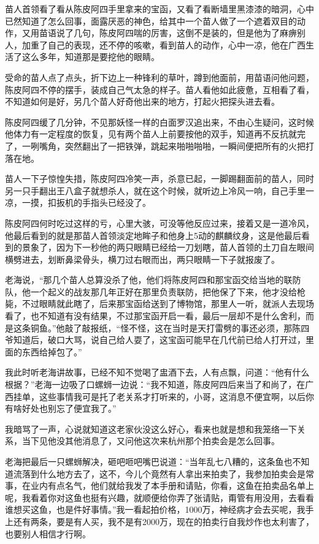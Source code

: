 苗人首领看了看从陈皮阿四手里拿来的宝函，又看了看断墙里黑漆漆的暗洞，心中已然知道了怎么回事，面露厌恶的神色，给其中一个苗人做了一个遮着双目的动作，又用苗语说了几句，陈皮阿四喘的厉害，这倒不是装的，但是他为了麻痹别人，加重了自己的表现，还不停的咳嗽，看到苗人的动作，心中一凉，他在广西生活了这么多年，知道那是要挖他的眼睛。

受命的苗人点了点头，折下边上一种锋利的草叶，蹲到他面前，用苗语问他问题，陈皮阿四不停的摆手，装成自己气太急的样子。苗人看他如此疲惫，互相看了看，不知道如何是好，另几个苗人好奇他出来的地方，打起火把探头进去看。

陈皮阿四缓了几分钟，不见那妖怪一样的白面罗汉追出来，不由心生疑问，这时候他体力有一定程度的恢复，见有两个苗人上前要按他的双手，知道再不反抗就完了，一咧嘴角，突然翻出了一把铁弹，跳起来啪啪啪啪，一瞬间便把所有的火把打落在地。

苗人一下子惊惶失措，陈皮阿四冷笑一声，杀意已起，一脚踢翻面前的苗人，同时另一只手翻出王八盒子就想杀人，就在这个时候，就听边上冷风一响，自己手里一凉，一摸，扣扳机的手指头已经没了。

陈皮阿四何时吃过这样的亏，心里大骇，可没等他反应过来，接着又是一道冷风，他最后看到的就是那苗人首领淡定地眸子和他身上5动的麒麟纹身，这是他最后看到的景象了，因为下一秒他的两只眼睛已经给一刀划瞎，苗人首领的土刀自左眼间横劈进去，划断鼻梁骨头，横刀过右眼而出，两只眼睛一下子就报废了。

老海说，“那几个苗人总算没杀了他，他们将陈皮阿四和那宝函交给当地的联防队，他一个起义的战友那几年正好在那里负责联防，把他保了下来，他才没给枪毙，不过眼睛就此瞎了，后来那宝函给送到了博物馆，那里人一听，就派人去现场看了，也不知道有没有结果，不过那宝函开启一看，最后一层却不是什么舍利，而是这条铜鱼。”他敲了敲报纸，“怪不怪，这在当时是天打雷劈的事还必须，那陈四爷知道后，破口大骂，说自己给人耍了，这宝函可能早在几代前已给人打开过，里面的东西给掉包了。”

我此时听老海讲故事，已经不知不觉喝了盅酒下去，人有点飘，问道：“他有什么根据？”老海一边吸了口螺蛳一边说：“我不知道，陈皮阿四后来当了和尚了，在广西挂单，这些事情我可是托了老关系才打听来的，小哥，这消息不便宜啊，以后你有啥好处也别忘了便宜我了。”

我暗骂了一声，心说就知道这老家伙没这么好心，看来也就是想和我笼络一下关系，当下见他没其他消息了，又问他这次来杭州那个拍卖会是怎么回事。

老海把最后一只螺蛳解决，砸吧咂吧嘴巴说道：“当年乱七八糟的，这条鱼也不知道流落到什么地方去了，这不，今儿个竟然有人拿出来拍卖了，我参加拍卖会是常事，在业内有点名气，他们就给我发了本手册和请贴，你看，这鱼在拍卖品名单上呢，我看着你对这鱼也挺有兴趣，就顺便给你弄了张请贴，甭管有用没用，去看看谁想买这鱼，也是件好事情。”我一看起拍价格，1000万，神经病才会去买呢，我手上还有两条，要是有人买，我不是有2000万，现在的拍卖行自我炒作也太利害了，也要别人相信才行啊。


